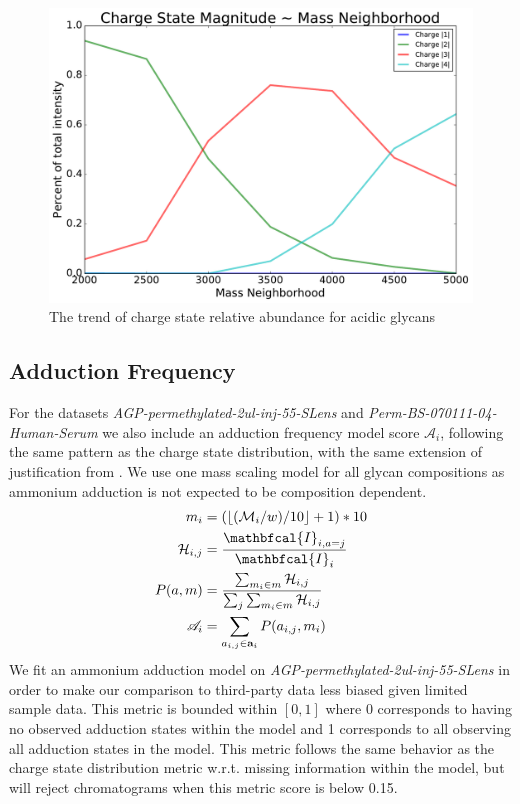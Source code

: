         \begin{figure}
            \centering
            \includegraphics[width=0.75\linewidth]{figure/charge_trend_plot}
            \caption{The trend of charge state relative abundance for acidic glycans}
            \label{fig:charge_trend_plot}
        \end{figure}

    \subsection{Adduction Frequency}
        For the datasets \textit{AGP-permethylated-2ul-inj-55-SLens} and \textit{Perm-BS-070111-04-Human-Serum}
        we also include an adduction frequency model score $\mathscr{A}_i$, following the same
        pattern as the charge state distribution, with the same extension of justification
        from \cite{Maxwell2012}. We use one mass scaling model for all glycan compositions
        as ammonium adduction is not expected to be composition dependent.
        \begin{align}
            m_i &= (\floor*{(\mathcal{M}_i / w) / 10} + 1) * 10 \nonumber\\
            \mathcal{H}_{i,j} &= \frac{
                \mathbfcal{I}_{i, a=j}}{\mathbfcal{I}_i} \nonumber\\
            P(a, m) &= \frac{\sum_{m_i \in m} \mathcal{H}_{i, j}}{\sum_j{
                \sum_{m_i \in m} \mathcal{H}_{i, j}}} \nonumber\\
            \mathscr{A}_i &= \sum_{a_{i, j} \in \mathbf{a}_i}{P(a_{i, j}, m_i)}
        \end{align}
        We fit an ammonium adduction model on \textit{AGP-permethylated-2ul-inj-55-SLens}
        in order to make our comparison to third-party data less biased given limited sample data.
        This metric is bounded within $[0, 1]$ where 0 corresponds to having no observed adduction
        states within the model and 1 corresponds to all observing all adduction states in the model.
        This metric follows the same behavior as the charge state distribution metric w.r.t. missing
        information within the model, but will reject chromatograms when this metric score is below 0.15.


